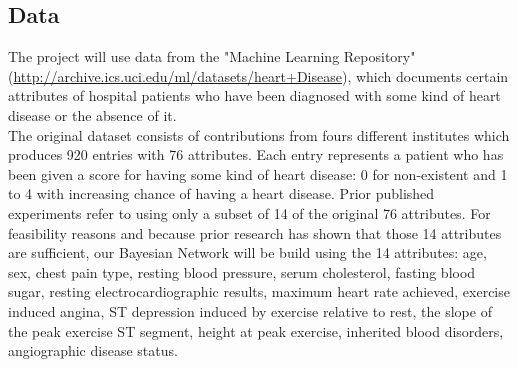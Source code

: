 \documentclass[a4paper]{article}
\begin{document}
\subsection*{Data}

The project will use data from the "Machine Learning Repository" (\url{http://archive.ics.uci.edu/ml/datasets/heart+Disease}), which documents certain attributes of hospital patients who have been diagnosed with some kind of heart disease or the absence of it.\\
The original dataset consists of contributions from fours different institutes which produces 920 entries with 76 attributes. Each entry represents a patient who has been given a score for having some kind of heart disease: 0 for non-existent and 1 to 4 with increasing chance of having a heart disease. Prior published experiments refer to using only a subset of 14 of the original 76 attributes. For feasibility reasons and because prior research has shown that those 14 attributes are sufficient, our Bayesian Network will be build using the 14 attributes: age, sex, chest pain type, resting blood pressure, serum cholesterol, fasting blood sugar, resting electrocardiographic results, maximum heart rate achieved, exercise induced angina, ST depression induced by exercise relative to rest, the slope of the peak exercise ST segment, height at peak exercise, inherited blood disorders, angiographic disease status.
\end{document}
